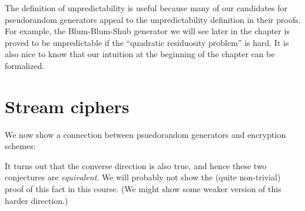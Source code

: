 The definition of unpredictability is useful because many of our
candidates for pseudorandom generators appeal to the unpredictability
definition in their proofs. For example, the Blum-Blum-Shub generator we
will see later in the chapter is proved to be unpredictable if the
``quadratic residuosity problem'' is hard. It is also nice to know that
our intuition at the beginning of the chapter can be formalized.

\section{Stream ciphers}\label{Stream-ciphers}

We now show a connection between psuedorandom generators and encryption
schemes:

\hypertarget{PRGandcipherthm}{}

It turns out that the converse direction is also true, and hence these
two conjectures are \emph{equivalent}. We will probably not show the
(quite non-trivial) proof of this fact in this course. (We might show
some weaker version of this harder direction.)

